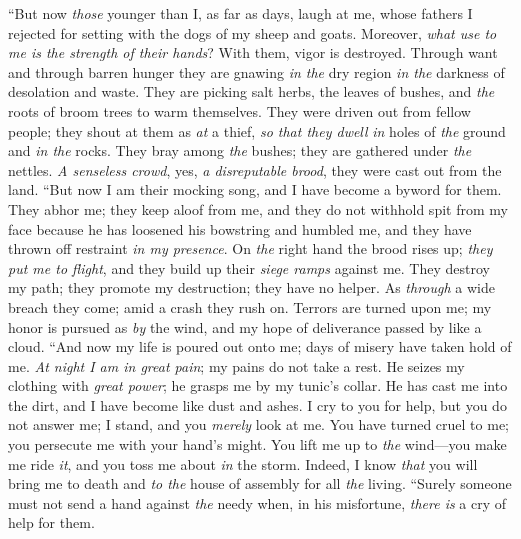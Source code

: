 \begin{biblechapter} %
 “But now \textit{those} younger than I, as far as days, laugh at me, 
whose fathers I rejected for setting with the dogs of my sheep and goats.
\verse Moreover, \textit{what use to me is the strength of their hands}? 
With them, vigor is destroyed.
\verse Through want and through barren hunger 
they are gnawing \textit{in the} dry region \textit{in the} darkness of desolation and waste.
\verse They are picking salt herbs, the leaves of bushes, 
and \textit{the} roots of broom trees to warm themselves.
\verse They were driven out from fellow people; 
they shout at them as \textit{at} a thief,
\verse \textit{so that they dwell} 
\textit{in} holes of \textit{the} ground and \textit{in the} rocks.
\verse They bray among \textit{the} bushes; 
they are gathered under \textit{the} nettles.
\verse \textit{A senseless crowd}, yes, \textit{a disreputable brood}, 
they were cast out from the land.
\verse “But now I am their mocking song, 
and I have become a byword for them.
\verse They abhor me; they keep aloof from me, 
and they do not withhold spit from my face
\verse because he has loosened his bowstring and humbled me, 
and they have thrown off restraint \textit{in my presence}.
\verse On \textit{the} right hand the brood rises up; 
\textit{they put me to flight}, 
and they build up their \textit{siege ramps} against me.
\verse They destroy my path; 
they promote my destruction; 
they have no helper.
\verse As \textit{through} a wide breach they come; 
amid a crash they rush on.
\verse Terrors are turned upon me; 
my honor is pursued as \textit{by} the wind, 
and my hope of deliverance passed by like a cloud.
\verse “And now my life is poured out onto me; 
days of misery have taken hold of me.
\verse \textit{At night I am in great pain}; 
my pains do not take a rest.
\verse He seizes my clothing with \textit{great power}; 
he grasps me by my tunic’s collar.
\verse He has cast me into the dirt, 
and I have become like dust and ashes.
\verse I cry to you for help, but you do not answer me; 
I stand, and you \textit{merely} look at me.
\verse You have turned cruel to me; 
you persecute me with your hand’s might.
\verse You lift me up to \textit{the} wind—you make me ride \textit{it}, 
and you toss me about \textit{in} the storm.
\verse Indeed, I know \textit{that} you will bring me to death 
and \textit{to the} house of assembly for all \textit{the} living.
\verse “Surely someone must not send a hand against \textit{the} needy 
when, in his misfortune, \textit{there is} a cry of help for them.

\end{biblechapter}
